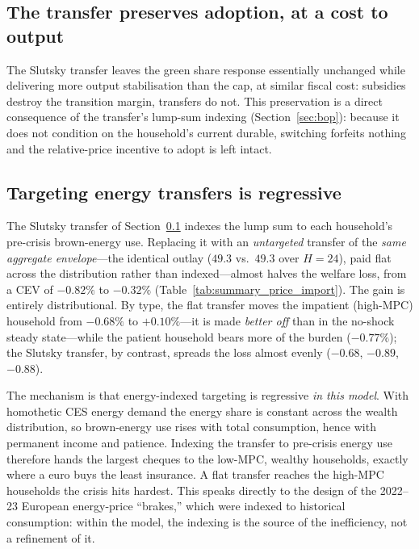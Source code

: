 \documentclass[11pt,a4paper]{article}
\begin{document}
\subsection{The transfer preserves adoption, at a cost to output}
\label{sec:transfer}

The Slutsky transfer leaves the green share response essentially unchanged while delivering more output stabilisation than the cap, at
similar fiscal cost: subsidies destroy the transition margin, transfers do
not. This preservation is a direct consequence of the transfer's lump-sum
indexing (Section~\ref{sec:bop}): because it does not condition on the
household's current durable, switching forfeits nothing and the relative-price
incentive to adopt is left intact.

\subsection{Targeting energy transfers is regressive}
\label{sec:flat}

The Slutsky transfer of Section~\ref{sec:transfer} indexes the lump sum to each
household's pre-crisis brown-energy use. Replacing it with an
\emph{untargeted} transfer of the \emph{same aggregate envelope}---the identical
outlay ($49.3$ vs.\ $49.3$ over $H=24$), paid flat across the distribution rather
than indexed---almost halves the welfare loss, from a CEV of $-0.82\%$ to
$-0.32\%$ (Table~\ref{tab:summary_price_import}). The gain is entirely
distributional. By type, the flat transfer moves the impatient (high-MPC)
household from $-0.68\%$ to $+0.10\%$---it is made \emph{better off} than in the
no-shock steady state---while the patient household bears more of the burden
($-0.77\%$); the Slutsky transfer, by contrast, spreads the loss almost evenly
($-0.68$, $-0.89$, $-0.88$).

The mechanism is that energy-indexed targeting is regressive \emph{in this
model}. With homothetic CES energy demand the energy share is constant across the
wealth distribution, so brown-energy use rises with total consumption, hence with
permanent income and patience. Indexing the transfer to pre-crisis energy use
therefore hands the largest cheques to the low-MPC, wealthy households, exactly
where a euro buys the least insurance. A flat transfer reaches the high-MPC
households the crisis hits hardest. This speaks directly to the design of the
2022--23 European energy-price ``brakes,'' which were indexed to historical
consumption: within the model, the indexing is the source of the inefficiency,
not a refinement of it.
\end{document}
